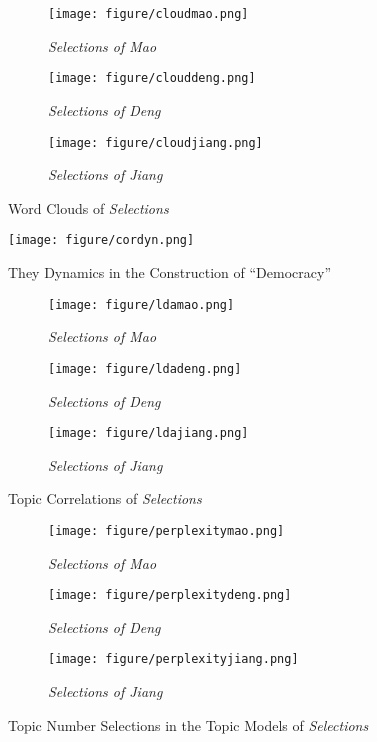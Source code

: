 \documentclass[abstracton,UTF8]{ctexart}
\begin{document}
\begin{figure}[h!]
	\begin{subfigure}{0.33\textwidth}
		\texttt{[image: figure/cloudmao.png]}
		\caption{\textit{Selections of Mao}}
		\label{f:cloudmao}
	\end{subfigure}
	\begin{subfigure}{0.33\textwidth}
		\texttt{[image: figure/clouddeng.png]}
		\caption{\textit{Selections of Deng}}
		\label{f:clouddeng}
	\end{subfigure}
	\begin{subfigure}{0.33\textwidth}
		\texttt{[image: figure/cloudjiang.png]}
		\caption{\textit{Selections of Jiang}}
		\label{f:cloudjiang}
	\end{subfigure}
	\caption{Word Clouds of \textit{Selections}}
	\label{f:cloudsele}
\end{figure}

\begin{figure}[htbp]
	\centering
	\caption{They Dynamics in the Construction of ``Democracy''}\label{f:cordyn}
	\texttt{[image: figure/cordyn.png]}
\end{figure}

\begin{figure}[h!]
	\begin{subfigure}{0.5\textwidth}
		\texttt{[image: figure/ldamao.png]}
		\caption{\textit{Selections of Mao}}
		\label{f:ldamao}
	\end{subfigure}
	\begin{subfigure}{0.5\textwidth}
		\texttt{[image: figure/ldadeng.png]}
		\caption{\textit{Selections of Deng}}
		\label{f:laddeng}
	\end{subfigure}
	\begin{subfigure}{0.5\textwidth}
		\texttt{[image: figure/ldajiang.png]}
		\caption{\textit{Selections of Jiang}}
		\label{f:ldajiang}
	\end{subfigure}
	\caption{Topic Correlations of \textit{Selections}}
	\label{f:lda.sele}
\end{figure}

\begin{figure}[h!]
	\begin{subfigure}{0.33\textwidth}
		\texttt{[image: figure/perplexitymao.png]}
		\caption{\textit{Selections of Mao}}
		\label{f:perplexitymao}
	\end{subfigure}
	\begin{subfigure}{0.33\textwidth}
		\texttt{[image: figure/perplexitydeng.png]}
		\caption{\textit{Selections of Deng}}
		\label{f:perplexitydeng}
	\end{subfigure}
	\begin{subfigure}{0.33\textwidth}
		\texttt{[image: figure/perplexityjiang.png]}
		\caption{\textit{Selections of Jiang}}
		\label{f:perplexityjiang}
	\end{subfigure}
	\caption{Topic Number Selections in the Topic Models of \textit{Selections}}
	\label{f:perplexity.sele}
\end{figure}
\end{document}

